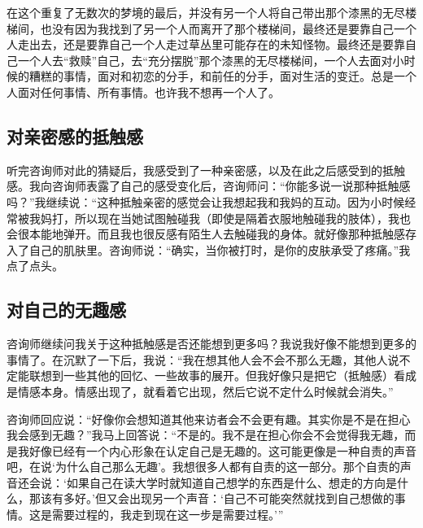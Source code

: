 在这个重复了无数次的梦境的最后，并没有另一个人将自己带出那个漆黑的无尽楼梯间，也没有因为我找到了另一个人而离开了那个楼梯间，最终还是要靠自己一个人走出去，还是要靠自己一个人走过草丛里可能存在的未知怪物。最终还是要靠自己一个人去“救赎”自己，去“充分摆脱”那个漆黑的无尽楼梯间，一个人去面对小时候的糟糕的事情，面对和初恋的分手，和前任的分手，面对生活的变迁。总是一个人面对任何事情、所有事情。也许我不想再一个人了。







\subsection*{对亲密感的抵触感}

听完咨询师对此的猜疑后，我感受到了一种亲密感，以及在此之后感受到的抵触感。我向咨询师表露了自己的感受变化后，咨询师问：“你能多说一说那种抵触感吗？”我继续说：“这种抵触亲密的感觉会让我想起我和我妈的互动。因为小时候经常被我妈打，所以现在当她试图触碰我（即使是隔着衣服地触碰我的肢体），我也会很本能地弹开。而且我也很反感有陌生人去触碰我的身体。就好像那种抵触感存入了自己的肌肤里。咨询师说：“确实，当你被打时，是你的皮肤承受了疼痛。”我点了点头。







\subsection*{对自己的无趣感}

咨询师继续问我关于这种抵触感是否还能想到更多吗？我说我好像不能想到更多的事情了。在沉默了一下后，我说：“我在想其他人会不会不那么无趣，其他人说不定能联想到一些其他的回忆、一些故事的展开。但我好像只是把它（抵触感）看成是情感本身。情感出现了，就看着它出现，然后它说不定什么时候就会消失。”

咨询师回应说：“好像你会想知道其他来访者会不会更有趣。其实你是不是在担心我会感到无趣？”我马上回答说：“不是的。我不是在担心你会不会觉得我无趣，而是我好像已经有一个内心形象在认定自己是无趣的。这可能更像是一种自责的声音吧，在说‘为什么自己那么无趣’。我想很多人都有自责的这一部分。那个自责的声音还会说：‘如果自己在读大学时就知道自己想学的东西是什么、想走的方向是什么，那该有多好。’但又会出现另一个声音：‘自己不可能突然就找到自己想做的事情。这是需要过程的，我走到现在这一步是需要过程。’”

